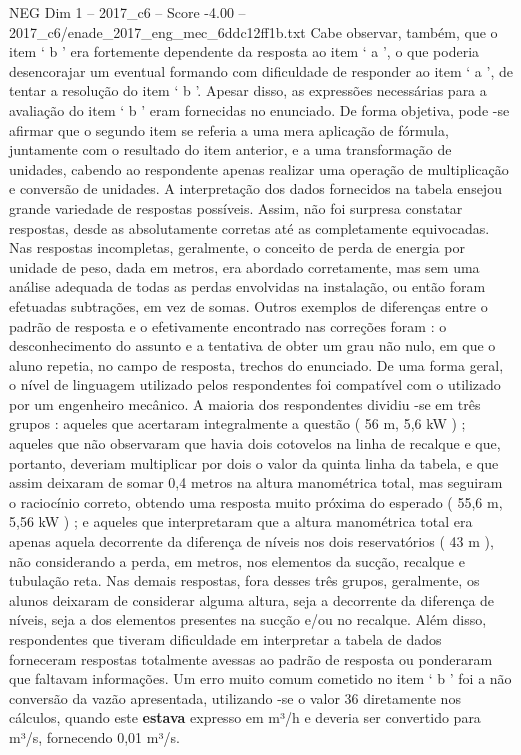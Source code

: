 \begin{textsample}{NEG Dim 1 – 2017\_c6 – Score -4.00 – 2017\_c6/enade\_2017\_eng\_mec\_6ddc12ff1b.txt}
Cabe observar, também, que o item ‘ b ’ era fortemente dependente da resposta ao item ‘ a ’, o que poderia desencorajar um eventual formando com dificuldade de responder ao item ‘ a ’, de tentar a resolução do item ‘ b ’.
Apesar disso, as expressões necessárias para a avaliação do item ‘ b ’ eram fornecidas no enunciado.
De forma objetiva, pode -se afirmar que o segundo item se referia a uma mera aplicação de fórmula, juntamente com o resultado do item anterior, e a uma transformação de unidades, cabendo ao respondente apenas realizar uma operação de multiplicação e conversão de unidades.
A interpretação dos dados fornecidos na tabela ensejou grande variedade de respostas possíveis.
Assim, não foi surpresa constatar respostas, desde as absolutamente corretas até as completamente equivocadas.
Nas respostas incompletas, geralmente, o conceito de perda de energia por unidade de peso, dada em metros, era abordado corretamente, mas sem uma análise adequada de todas as perdas envolvidas na instalação, ou então foram efetuadas subtrações, em vez de somas.
Outros exemplos de diferenças entre o padrão de resposta e o efetivamente encontrado nas correções foram : o desconhecimento do assunto e a tentativa de obter um grau não nulo, em que o aluno repetia, no campo de resposta, trechos do enunciado.
De uma forma geral, o nível de linguagem utilizado pelos respondentes foi compatível com o utilizado por um engenheiro mecânico.
A maioria dos respondentes dividiu -se em três grupos : aqueles que acertaram integralmente a questão ( 56 m, 5,6 kW ) ; aqueles que não observaram que havia dois cotovelos na linha de recalque e que, portanto, deveriam multiplicar por dois o valor da quinta linha da tabela, e que assim deixaram de somar 0,4 metros na altura manométrica total, mas seguiram o raciocínio correto, obtendo uma resposta muito próxima do esperado ( 55,6 m, 5,56 kW ) ; e aqueles que interpretaram que a altura manométrica total era apenas aquela decorrente da diferença de níveis nos dois reservatórios ( 43 m ), não considerando a perda, em metros, nos elementos da sucção, recalque e tubulação reta.
Nas demais respostas, fora desses três grupos, geralmente, os alunos deixaram de considerar alguma altura, seja a decorrente da diferença de níveis, seja a dos elementos presentes na sucção e/ou no recalque.
Além disso, respondentes que tiveram dificuldade em interpretar a tabela de dados forneceram respostas totalmente avessas ao padrão de resposta ou ponderaram que faltavam informações.
Um erro muito comum cometido no item ‘ b ’ foi a não conversão da vazão apresentada, utilizando -se o valor 36 diretamente nos cálculos, quando este \textbf{estava} expresso em m³/h e deveria ser convertido para m³/s, fornecendo 0,01 m³/s.

\end{textsample}
